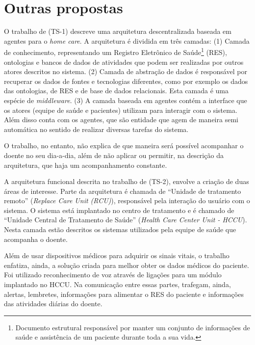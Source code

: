 \section{Outras propostas} \label{sec:solucoes-semelhantes}

O trabalho de  (TS-1) descreve uma arquitetura
descentralizada baseada em agentes para o \textit{home care}. A arquitetura é
dividida em três camadas: (1) Camada de conhecimento, representando um Registro
Eletrônico de Saúde\footnote{Documento estrutural responsável por 
manter um conjunto de informações de saúde e assistência de um paciente durante 
toda a sua vida.} (RES), ontologias e bancos de dados de atividades que podem
ser realizadas por outros atores descritos no sistema. (2) Camada de abstração
de dados é responsável por recuperar os dados de fontes e tecnologias
diferentes, como por exemplo os dados das ontologias, de RES e de base de dados
relacionais. Esta camada é uma espécie de \textit{middleware}. (3) A camada
baseada em agentes contém a interface \web[] que os atores (equipe de saúde e
pacientes) utilizam para interagir com o sistema. Além disso conta com os
agentes, que são entidade que agem de maneira semi automática no sentido de
realizar diversas tarefas do sistema. 

O trabalho, no entanto, não explica de que maneira será possível acompanhar o
doente no seu dia-a-dia, além de não aplicar ou permitir, na descrição da
arquitetura, que haja um acompanhamento constante.

A arquitetura funcional descrita no trabalho de  (TS-2),
envolve a criação de duas áreas de interesse. Parte da arquitetura é chamada de
``Unidade de tratamento remoto'' (\textit{Replace Care Unit (RCU)}), responsável
pela interação do usuário com o sistema. O sistema está implantado no centro
de tratamento e é chamado de  ``Unidade Central de Tratamento de Saúde''
(\textit{Health Care Center Unit - HCCU}). Nesta camada estão descritos os
sistemas utilizados pela equipe de saúde que acompanha o doente.

Além de usar dispositivos médicos para adquirir os sinais vitais, o trabalho
enfatiza, ainda, a solução criada para melhor obter os dados médicos do
paciente. Foi utilizado reconhecimento de voz através de ligações para um
módulo implantado no HCCU. Na comunicação entre essas partes, trafegam, ainda,
alertas, lembretes, informações para alimentar o RES do paciente e informações
das atividades diárias do doente.

